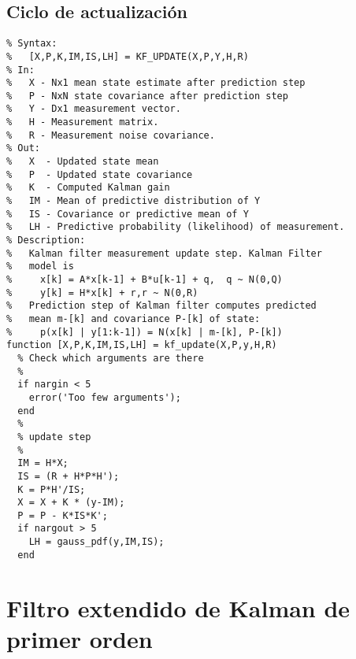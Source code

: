 \subsection{Ciclo de actualización}
\lstset{language=Matlab, breaklines=true, basicstyle=\footnotesize}
\lstset{numbers=left, numberstyle=\tiny, stepnumber=1, numbersep=-2pt}
\begin{lstlisting}[frame=single]
%KF_UPDATE  Kalman Filter update step
% Syntax:
%   [X,P,K,IM,IS,LH] = KF_UPDATE(X,P,Y,H,R)
% In:
%   X - Nx1 mean state estimate after prediction step
%   P - NxN state covariance after prediction step
%   Y - Dx1 measurement vector.
%   H - Measurement matrix.
%   R - Measurement noise covariance.
% Out:
%   X  - Updated state mean
%   P  - Updated state covariance
%   K  - Computed Kalman gain
%   IM - Mean of predictive distribution of Y
%   IS - Covariance or predictive mean of Y
%   LH - Predictive probability (likelihood) of measurement. 
% Description:
%   Kalman filter measurement update step. Kalman Filter
%   model is
%     x[k] = A*x[k-1] + B*u[k-1] + q,  q ~ N(0,Q)
%     y[k] = H*x[k] + r,r ~ N(0,R)
%   Prediction step of Kalman filter computes predicted
%   mean m-[k] and covariance P-[k] of state:
%     p(x[k] | y[1:k-1]) = N(x[k] | m-[k], P-[k])
function [X,P,K,IM,IS,LH] = kf_update(X,P,y,H,R)
  % Check which arguments are there
  %
  if nargin < 5
    error('Too few arguments');
  end
  %
  % update step
  %
  IM = H*X;
  IS = (R + H*P*H');
  K = P*H'/IS;
  X = X + K * (y-IM);
  P = P - K*IS*K';
  if nargout > 5
    LH = gauss_pdf(y,IM,IS);
  end
\end{lstlisting}
\section{Filtro extendido de Kalman de primer orden}
